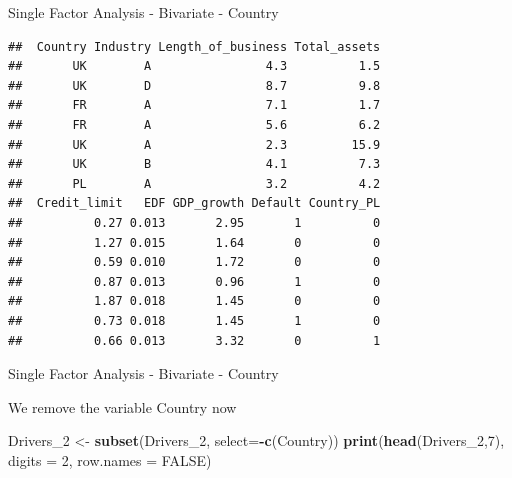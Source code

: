 \documentclass[9pt,ignorenonframetext,]{beamer}
\newenvironment{Shaded}{\begin{snugshade}}{\end{snugshade}}
\newcommand{\KeywordTok}[1]{\textcolor[rgb]{0.13,0.29,0.53}{\textbf{#1}}}
\newcommand{\DataTypeTok}[1]{\textcolor[rgb]{0.13,0.29,0.53}{#1}}
\newcommand{\DecValTok}[1]{\textcolor[rgb]{0.00,0.00,0.81}{#1}}
\newcommand{\StringTok}[1]{\textcolor[rgb]{0.31,0.60,0.02}{#1}}
\newcommand{\OtherTok}[1]{\textcolor[rgb]{0.56,0.35,0.01}{#1}}
\newcommand{\OperatorTok}[1]{\textcolor[rgb]{0.81,0.36,0.00}{\textbf{#1}}}
\newcommand{\NormalTok}[1]{#1}
\begin{document}
\begin{frame}[fragile]{Single Factor Analysis - Bivariate - Country}

\begin{verbatim}
##  Country Industry Length_of_business Total_assets
##       UK        A                4.3          1.5
##       UK        D                8.7          9.8
##       FR        A                7.1          1.7
##       FR        A                5.6          6.2
##       UK        A                2.3         15.9
##       UK        B                4.1          7.3
##       PL        A                3.2          4.2
##  Credit_limit   EDF GDP_growth Default Country_PL
##          0.27 0.013       2.95       1          0
##          1.27 0.015       1.64       0          0
##          0.59 0.010       1.72       0          0
##          0.87 0.013       0.96       1          0
##          1.87 0.018       1.45       0          0
##          0.73 0.018       1.45       1          0
##          0.66 0.013       3.32       0          1
\end{verbatim}

\end{frame}

\begin{frame}[fragile]{Single Factor Analysis - Bivariate - Country}

We remove the variable Country now

\begin{Shaded}
\begin{Highlighting}[]
\NormalTok{Drivers_}\DecValTok{2}\NormalTok{ <-}\StringTok{ }\KeywordTok{subset}\NormalTok{(Drivers_}\DecValTok{2}\NormalTok{, }\DataTypeTok{select=}\OperatorTok{-}\KeywordTok{c}\NormalTok{(Country))}
\KeywordTok{print}\NormalTok{(}\KeywordTok{head}\NormalTok{(Drivers_}\DecValTok{2}\NormalTok{,}\DecValTok{7}\NormalTok{), }\DataTypeTok{digits =} \DecValTok{2}\NormalTok{, }\DataTypeTok{row.names =} \OtherTok{FALSE}\NormalTok{)}
\end{Highlighting}
\end{Shaded}

\end{frame}
\end{document}
